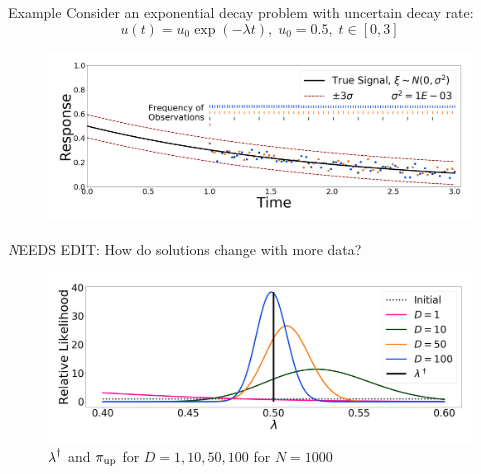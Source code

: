 \vspace{-0.75cm}
\begin{block}{Example}
\centering
    Consider an exponential decay problem with uncertain decay rate:
   \begin{equation*}
       u(t) = u_0\exp(-\lambda t), \; u_0 = 0.5 ,\; t\in[0,3]
   \end{equation*}
\vspace{-0.5cm}
    \begin{figure}
        \includegraphics[width=26cm]{figures/exponential_decay_response_sigma-10E-4}
    \end{figure}


\vspace{1cm}

\centering
{}
{\emph NEEDS EDIT: How do solutions change with more data?}
\vspace{-0.5cm}
    \begin{figure}
        \includegraphics[width=26cm]{figures/updated_convergence_sigma-10E-4}
        \vspace{-0.5cm}
        \caption{ $\operatorname*{\lambda}^\dagger$ and $\operatorname*{\pi_{up}}$ for $D=1, 10, 50, 100$ for $N=1000$}
    \end{figure}



\end{block}
